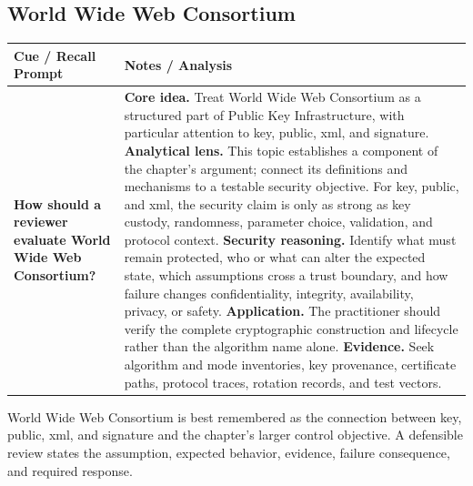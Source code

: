 \documentclass[11pt]{article}
\newcommand{\CornellHeader}{%
\rowcolor{Navy}\color{white}\bfseries Cue / Recall Prompt & \color{white}\bfseries Notes / Analysis\\\hline}
\newcommand{\CornellRow}[2]{%
\cellcolor{CueGray}\RaggedRight\textbf{#1} & \RaggedRight #2\\\hline}
\begin{document}
\subsection*{World Wide Web Consortium}
\begin{longtable}{>{\RaggedRight\arraybackslash}p{}|>{\RaggedRight\arraybackslash}p{}}
\CornellHeader
\CornellRow{How should a reviewer evaluate World Wide Web Consortium?}{\textbf{Core idea.} Treat World Wide Web Consortium as a structured part of Public Key Infrastructure, with particular attention to key, public, xml, and signature. \textbf{Analytical lens.} This topic establishes a component of the chapter's argument; connect its definitions and mechanisms to a testable security objective. For key, public, and xml, the security claim is only as strong as key custody, randomness, parameter choice, validation, and protocol context. \textbf{Security reasoning.} Identify what must remain protected, who or what can alter the expected state, which assumptions cross a trust boundary, and how failure changes confidentiality, integrity, availability, privacy, or safety. \textbf{Application.} The practitioner should verify the complete cryptographic construction and lifecycle rather than the algorithm name alone. \textbf{Evidence.} Seek algorithm and mode inventories, key provenance, certificate paths, protocol traces, rotation records, and test vectors.}
\end{longtable}
\begin{topicsummary}
World Wide Web Consortium is best remembered as the connection between key, public, xml, and signature and the chapter's larger control objective. A defensible review states the assumption, expected behavior, evidence, failure consequence, and required response.
\end{topicsummary}
\end{document}

